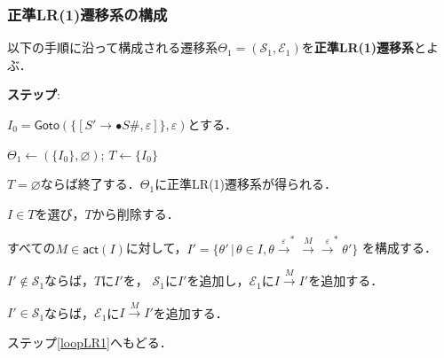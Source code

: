 \documentclass[dvipdfmx,cjk]{beamer}
\newcounter{coffee}
\begin{document}
\begin{frame}
  \frametitle{正準LR(1)遷移系の構成}
  {\small
    以下の手順に沿って構成される遷移系$\Theta_1=(\mathcal{S}_1,\mathcal{E}_1)$を{\bf 正準LR(1)遷移系}とよぶ．
    \begin{list}{{\rm\bf ステップ}:}{\setlength{\itemsep}{1pt}\setlength{\parsep}{0pt}}
      \item $I_0=\mathsf{Goto}(\{[S'\rightarrow\bullet S\texttt{\#},\varepsilon]\},\varepsilon)$とする．
      \item $\Theta_1\leftarrow(\{I_0\},\varnothing)$; $T\leftarrow\{I_0\}$
      \item\label{loopLR1} $T=\varnothing$ならば終了する．$\Theta_1$に正準LR(1)遷移系が得られる．
      \item $I\in T$を選び，$T$から削除する．
      \item すべての$M\in\mathsf{act}(I)$に対して，$I'=\{\theta'\,|\,\theta\in I,\theta
              \xrightarrow{\varepsilon}^\ast\xrightarrow{M}\xrightarrow{\varepsilon}^\ast\theta'\}$
            を構成する．
            \begin{list}{}{}
              \item $I'\notin\mathcal{S}_1$ならば，$T$に$I'$を，
                    $\mathcal{S}_1$に$I'$を追加し，$\mathcal{E}_1$に$I\xrightarrow{M}I'$を追加する．
              \item $I'\in\mathcal{S}_1$ならば，$\mathcal{E}_1$に$I\xrightarrow{M}I'$を追加する．
            \end{list}
      \item ステップ\ref{loopLR1}へもどる．
    \end{list}
  }
\end{frame}
\end{document}
